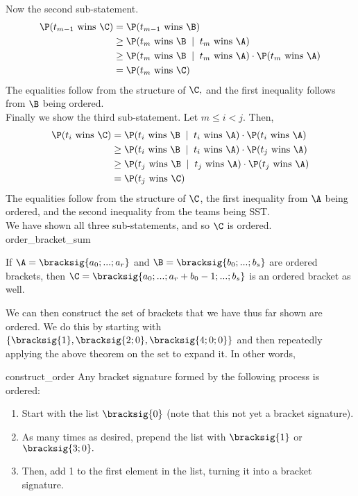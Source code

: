 {{Now the second sub-statement.
\begin{align*}
    \P(t_{m-1} \textrm{ wins }\C) &= \P(t_{m-1} \textrm{ wins }\B)\\
    &\geq \P(t_{m} \textrm{ wins }\B \;\mid\; t_{m} \textrm{ wins }\A)\\
    &\geq \P(t_{m} \textrm{ wins }\B \;\mid\; t_{m} \textrm{ wins }\A) \cdot \P(t_{m} \textrm{ wins }\A)\\
    &= \P(t_{m} \textrm{ wins }\C)
\end{align*}
The equalities follow from the structure of $\C,$ and the first inequality follows from $\B$ being ordered.\\

Finally we show the third sub-statement. Let $m \leq i < j.$ Then,
\begin{align*}
    \P(t_i \textrm{ wins }\C) &= \P(t_i \textrm{ wins }\B \;\mid\; t_i \textrm{ wins } \A)\cdot \P(t_i \textrm{ wins } \A)\\
    &\geq \P(t_i \textrm{ wins }\B \;\mid\; t_i \textrm{ wins } \A)\cdot \P(t_j \textrm{ wins } \A)\\
    &\geq \P(t_j \textrm{ wins }\B \;\mid\; t_j \textrm{ wins } \A)\cdot \P(t_j \textrm{ wins } \A)\\
    &= \P(t_j \textrm{ wins }\C)
\end{align*}
The equalities follow from the structure of $\C$, the first inequality from $\A$ being ordered, and the second inequality from the teams being SST.\\

We have shown all three sub-statements, and so $\C$ is ordered.
}{order_bracket_sum}

\begin{corollary}{}{}
    If $\A = \bracksig{a_0; ...; a_r}$ and $\B = \bracksig{b_0; ...; b_s}$ are ordered brackets, then $\C = \bracksig{a_0; ...; a_r + b_0 - 1; ...; b_s}$ is an ordered bracket as well.
\end{corollary}

We can then construct the set of brackets that we have thus far shown are ordered. We do this by starting with $\{\bracksig{1}, \bracksig{2; 0}, \bracksig{4; 0; 0}\}$ and then repeatedly applying the above theorem on the set to expand it. In other words,

\begin{corollary}{}{construct_order}
    Any bracket signature formed by the following process is ordered:
    \begin{enumerate}
        \item Start with the list $\bracksig{0}$ (note that this not yet a bracket signature).
        \item As many times as desired, prepend the list with $\bracksig{1}$ or $\bracksig{3; 0}.$
        \item Then, add 1 to the first element in the list, turning it into a bracket signature.
    \end{enumerate}
\end{corollary}

}
